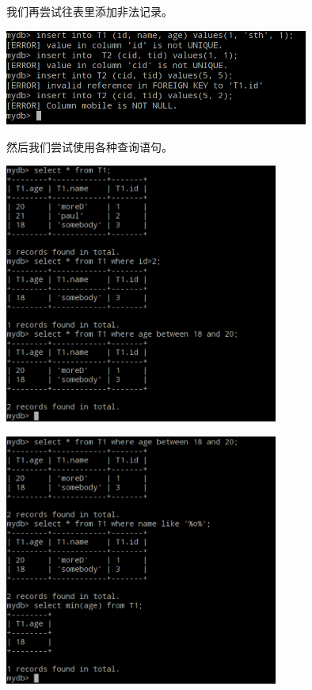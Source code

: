 \documentclass[11pt, a4paper]{article}
\makeatletter
\newcommand\fcaption{\def\@captype{figure}\caption}
\makeatother
\begin{document}
我们再尝试往表里添加非法记录。

\begin{center}
    \includegraphics[width=10cm]{fig/illegal-record}
    \fcaption{插入非法记录时报错}
\end{center}

然后我们尝试使用各种查询语句。

\begin{center}
    \includegraphics[width=9cm]{fig/query1}
    \fcaption{查询1}
\end{center}

\begin{center}
    \includegraphics[width=9cm]{fig/query2}
    \fcaption{查询2}
\end{center}
\end{document}
